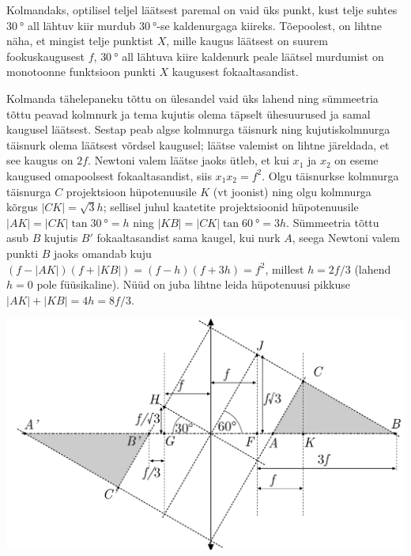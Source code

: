 \documentclass[10pt]{article}
\begin{document}
Kolmandaks, optilisel teljel läätsest paremal on vaid üks punkt, kust telje suhtes $\SI{30}\degree$ all lähtuv kiir murdub  $\SI{30}\degree$-se kaldenurgaga kiireks. Tõepoolest, on lihtne näha, et mingist telje punktist $X$, mille kaugus läätsest on suurem fookuskaugusest $f$, $\SI{30}\degree$  all lähtuva kiire kaldenurk peale läätsel murdumist on monotoonne funktsioon punkti $X$ kaugusest fokaaltasandist.

Kolmanda tähelepaneku tõttu on ülesandel vaid üks lahend ning sümmeetria tõttu peavad kolmnurk ja tema kujutis olema täpselt ühesuurused ja samal kaugusel läätsest. Sestap peab algse kolmnurga täisnurk ning kujutiskolmnurga täisnurk olema läätsest võrdsel kaugusel; läätse valemist on lihtne järeldada, et see kaugus on $2f$. Newtoni valem läätse jaoks ütleb, et kui $x_1$ ja $x_2$ on eseme kaugused omapoolsest fokaaltasandist, siis $x_1x_2=f^2$. Olgu täisnurkse kolmnurga täisnurga $C$ projektsioon hüpotenuusile $K$ (vt joonist) ning olgu kolmnurga kõrgus $|CK|=\sqrt 3h$; sellisel juhul kaatetite projektsioonid hüpotenuusile $|AK|=|CK|\tan \SI{30}\degree=h$ ning $|KB|=|CK|\tan \SI{60}\degree=3h$. Sümmeetria tõttu asub $B$ kujutis $B'$ fokaaltasandist sama kaugel, kui nurk $A$, seega Newtoni valem punkti $B$ jaoks omandab kuju $(f-|AK|)(f+|KB|)=(f-h)(f+3h)=f^2$, millest $h=2f/3$ (lahend $h=0$ pole füüsikaline). Nüüd on juba lihtne leida hüpotenuusi pikkuse $|AK|+|KB|=4h=8f/3$.
\begin{center}
  \includegraphics[width=\textwidth]{2024-v3g-08-yl.pdf}
\end{center}
\end{document}
